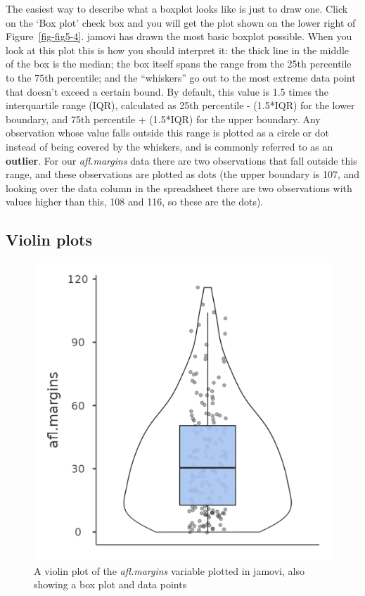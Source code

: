\documentclass[
  a4paper,
]{book}
\begin{document}
The easiest way to describe what a boxplot looks like is just to draw
one. Click on the `Box plot' check box and you will get the plot shown
on the lower right of Figure~\ref{fig-fig5-4}. jamovi has drawn the most
basic boxplot possible. When you look at this plot this is how you
should interpret it: the thick line in the middle of the box is the
median; the box itself spans the range from the 25th percentile to the
75th percentile; and the ``whiskers'' go out to the most extreme data
point that doesn't exceed a certain bound. By default, this value is 1.5
times the interquartile range (IQR), calculated as 25th percentile -
(1.5*IQR) for the lower boundary, and 75th percentile + (1.5*IQR) for
the upper boundary. Any observation whose value falls outside this range
is plotted as a circle or dot instead of being covered by the whiskers,
and is commonly referred to as an \textbf{outlier}. For our
\emph{afl.margins} data there are two observations that fall outside
this range, and these observations are plotted as dots (the upper
boundary is 107, and looking over the data column in the spreadsheet
there are two observations with values higher than this, 108 and 116, so
these are the dots).

\hypertarget{violin-plots}{%
\subsection{Violin plots}\label{violin-plots}}

\begin{figure}

\includegraphics[width=1\textwidth,height=\textheight]{images/fig5-5.png} \hfill{}

\caption{\label{fig-fig5-5}A violin plot of the \emph{afl.margins}
variable plotted in jamovi, also showing a box plot and data points}

\end{figure}
\end{document}
